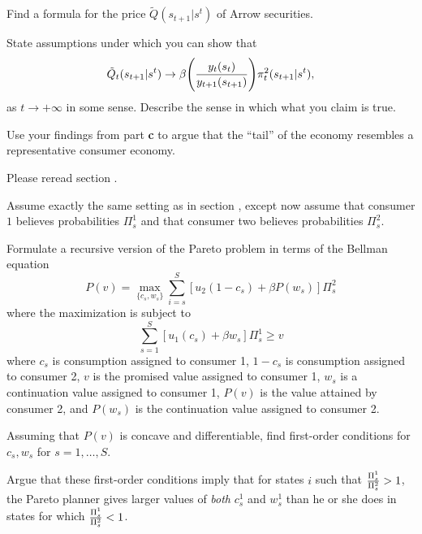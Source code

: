 \medskip
{}  Find a formula for the price $\tilde Q(s_{t+1} | s^t)$ of Arrow securities.

\medskip
{} State assumptions under which you can show that
$$ \tilde Q_t(s_{t+1} | s^t) \rightarrow  \beta \Biggl( {y_t(s_t) \over y_{t+1}(s_{t+1})} \Biggr) \pi_t^2(s_{t+1}| s^t), $$
as $t \rightarrow +\infty$ in some sense. Describe the sense in which what you claim is true.

\medskip
{} Use your findings from part {\bf c} to argue that the ``tail'' of the economy resembles a representative
consumer economy.

\medskip

 

\medskip


  Please reread section  .

\medskip

  Assume exactly the same setting as in section  , except now assume that consumer  $1$ believes probabilities $\Pi_s^1$ and that consumer two  believes
probabilities $\Pi_s^2$.

\medskip

  Formulate a recursive version of the Pareto problem in terms of the Bellman equation
$$  P(v) = \max_{\{c_s, w_s\}} \sum_{i=s}^S [ u_2(1-c_s) + \beta P(w_s) ] \Pi_s^2  $$
where the maximization is subject to
$$ \sum_{s=1}^S [u_1(c_s) + \beta w_s ] \Pi_s^1 \geq v  $$
where $c_s$ is consumption assigned to consumer 1, $1-c_s$ is consumption assigned to consumer 2,  $v$ is the promised value assigned to consumer 1,
$w_s$ is a continuation  value assigned to
consumer 1,
$P(v)$ is the value attained by consumer 2, and $P(w_s)$ is the continuation value assigned to consumer 2.

\medskip

  Assuming that $P(v)$ is concave and differentiable, find first-order conditions for $c_s, w_s$ for $s = 1, \ldots, S$.

\medskip


  Argue that these first-order conditions imply that for states $i$ such that ${\Pi_s^1 \over \Pi_s^2} > 1$, the Pareto planner
gives larger values of  {\it both\/} $c_s^1$ and $w_s^1$ than he or she does in states for which  ${\Pi_s^1 \over \Pi_s^2} < 1$.


